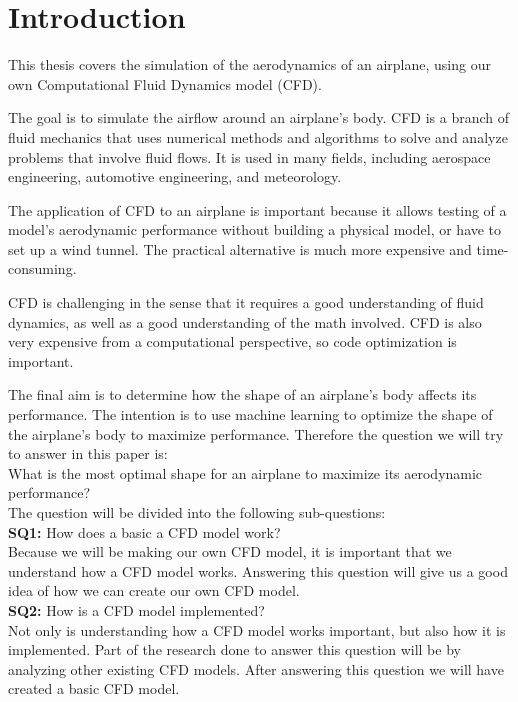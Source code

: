 \documentclass[a4paper,12pt,titlepage]{article}
\begin{document}
\section{Introduction}
This thesis covers the simulation of the aerodynamics of an airplane, using
our own Computational Fluid Dynamics model (CFD).

The goal is to simulate the airflow around an airplane's body. CFD is a
branch of fluid mechanics that uses numerical methods and algorithms to solve
and analyze problems that involve fluid flows. It is used in many fields,
including aerospace engineering, automotive engineering, and meteorology.

The application of CFD to an airplane is important because it allows testing
of a model's aerodynamic performance without building a physical model, or
have to set up a wind tunnel. The practical alternative is much more expensive
and time-consuming.

CFD is challenging in the sense that it requires a good understanding of fluid
dynamics, as well as a good understanding of the math involved. CFD is also
very expensive from a computational perspective, so code optimization is important.

The final aim is to determine how the shape of an airplane's body affects its
performance. The intention is to use machine learning to optimize the shape of the airplane's body to maximize
performance. Therefore the question we will try to answer in this paper is: \\

What is the most optimal shape for an airplane to maximize its aerodynamic performance? \\

The question will be divided into the following sub-questions: \\

\textbf{SQ1:} How does a basic a CFD model work? \\

Because we will be making our own CFD model, it is important that we understand how a CFD model works. 
Answering this question will give us a good idea of how we can create our own CFD model. \\

\textbf{SQ2:} How is a CFD model implemented? \\

Not only is understanding how a CFD model works important, but also how it is implemented. 
Part of the research done to answer this question will be by analyzing other existing CFD models.
After answering this question we will have created a basic CFD model. \\
\end{document}
